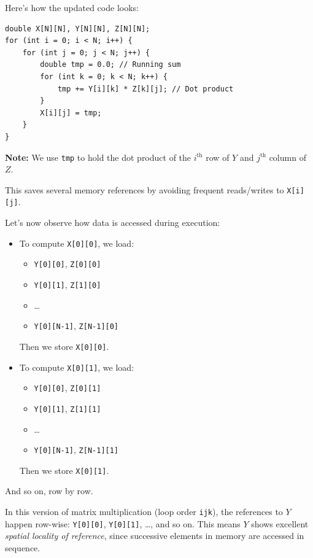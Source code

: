 \documentclass[12pt]{book}
\begin{document}
Here’s how the updated code looks:

\begin{lstlisting}[style=cppstyle, caption={Optimized Matrix Multiplication using temporary variable}, label={lst:opt-matmul}]
double X[N][N], Y[N][N], Z[N][N];
for (int i = 0; i < N; i++) {
    for (int j = 0; j < N; j++) {
        double tmp = 0.0; // Running sum
        for (int k = 0; k < N; k++) {
            tmp += Y[i][k] * Z[k][j]; // Dot product
        }
        X[i][j] = tmp;
    }
}
\end{lstlisting}

\textbf{Note:} We use \texttt{tmp} to hold the dot product of the $i^{\text{th}}$ row of $Y$ and $j^{\text{th}}$ column of $Z$.

This saves several memory references by avoiding frequent reads/writes to \texttt{X[i][j]}.

Let’s now observe how data is accessed during execution:

\begin{itemize}
    \item To compute \texttt{X[0][0]}, we load:
    \begin{itemize}
        \item \texttt{Y[0][0]}, \texttt{Z[0][0]}
        \item \texttt{Y[0][1]}, \texttt{Z[1][0]}
        \item \dots
        \item \texttt{Y[0][N-1]}, \texttt{Z[N-1][0]}
    \end{itemize}
    Then we store \texttt{X[0][0]}.

    \item To compute \texttt{X[0][1]}, we load:
    \begin{itemize}
        \item \texttt{Y[0][0]}, \texttt{Z[0][1]}
        \item \texttt{Y[0][1]}, \texttt{Z[1][1]}
        \item \dots
        \item \texttt{Y[0][N-1]}, \texttt{Z[N-1][1]}
    \end{itemize}
    Then we store \texttt{X[0][1]}.
\end{itemize}

And so on, row by row.

In this version of matrix multiplication (loop order \texttt{ijk}), the references to $Y$ happen row-wise: 
\texttt{Y[0][0]}, \texttt{Y[0][1]}, \dots, and so on. This means $Y$ shows excellent \textit{spatial locality of reference}, since successive elements in memory are accessed in sequence.
\end{document}
